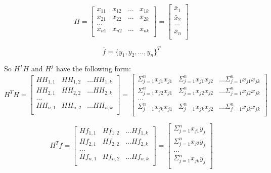 \begin{equation}
    H=\begin{bmatrix}
x_{11} & x_{12} &\dots &x_{1k}\\
x_{21} & x_{22} &\dots &x_{2k}\\
\dots\\
x_{n1} & x_{n2} &\dots &x_{nk}\\
\end{bmatrix}
=\begin{bmatrix}
\bar{x}_1\\
\bar{x}_2\\
\dots\\
\bar{x}_n\\
\end{bmatrix}
\end{equation}


\begin{equation}
    \bar{f} = \{y_1, y_2,\dots, y_n\}^T
\end{equation}

So $H^TH$ and $H^f$ have the following form:
\begin{equation}
    H^TH=\begin{bmatrix}
HH_{1,1} & HH_{1,2} &\dots HH_{1,k}\\
HH_{2,1} & HH_{2,2} &\dots HH_{2,k}\\
\dots\\
HH_{n,1} & HH_{n,2} &\dots HH_{n,k}\\
\end{bmatrix}=\begin{bmatrix}
\Sigma_{j=1}^nx_{j1}x_{j1} & \Sigma_{j=1}^nx_{j1}x_{j2} &\dots \Sigma_{j=1}^nx_{j1}x_{jk}\\
\Sigma_{j=1}^nx_{j2}x_{j1} & \Sigma_{j=1}^nx_{j2}x_{j2} &\dots \Sigma_{j=1}^nx_{j2}x_{jk}\\
\dots\\
\Sigma_{j=1}^nx_{jk}x_{j1} & \Sigma_{j=1}^nx_{jk}x_{j2} &\dots \Sigma_{j=1}^nx_{jk}x_{jk}\\
\end{bmatrix}
\end{equation}

\begin{equation}
    H^Tf=\begin{bmatrix}
Hf_{1,1} & Hf_{1,2} &\dots Hf_{1,k}\\
Hf_{2,1} & Hf_{2,2} &\dots Hf_{2,k}\\
\dots\\
Hf_{n,1} & Hf_{n,2} &\dots Hf_{n,k}\\
\end{bmatrix}=\begin{bmatrix}
\Sigma_{j=1}^nx_{j1}y_{j}\\
\Sigma_{j=1}^nx_{j2}y_{j}\\
\dots\\
\Sigma_{j=1}^nx_{jk}y_{j}\\
\end{bmatrix}
\end{equation}


